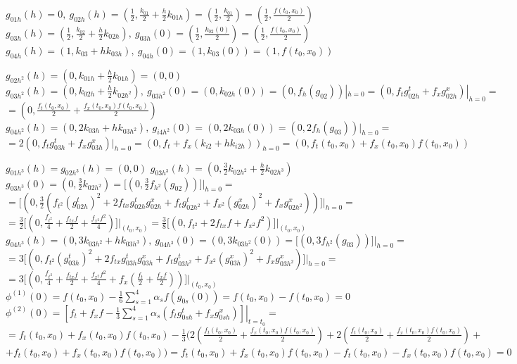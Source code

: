 \documentclass[a4paper,14pt]{article}
\begin{document}
$g_{01h}(h)=0,\ g_{02h}(h)=(\frac{1}{2},\frac{k_{01}}{2}+\frac{h}{2}k_{01h})=(\frac{1}{2},\frac{k_{01}}{2})=(\frac{1}{2},\frac{f(t_0,x_0)}{2})$\newline
$g_{03h}(h)=(\frac{1}{2},\frac{k_{02}}{2}+\frac{h}{2}k_{02h}),\ g_{03h}(0)=(\frac{1}{2},\frac{k_{02}(0)}{2})=(\frac{1}{2},\frac{f(t_0,x_0)}{2})$\newline
$g_{04h}(h)=(1,k_{03}+hk_{03h}),\ g_{04h}(0)=(1,k_{03}(0))=(1,f(t_0,x_0))$\newline

$g_{02h^2}(h)=(0,k_{01h}+\frac{h}{2}k_{01h})=(0,0)$\newline
$g_{03h^2}(h)=(0,k_{02h}+\frac{h}{2}k_{02h^2}),\ g_{03h^2}(0)=(0,k_{02h}(0))=(0,f_h(g_{02}))|_{h=0}=(0,f_tg_{02h}^t+f_xg_{02h}^x)|_{h=0}=$\newline
$=(0,\frac{f_t(t_0,x_0)}{2}+\frac{f_x(t_0,x_0)f(t_0,x_0)}{2})$\newline
$g_{04h^2}(h)=(0,2k_{03h}+hk_{03h^2}),\ g_{i4h^2}(0)=(0,2k_{03h}(0))=(0,2f_h(g_{03}))|_{h=0}=$\newline
$=2(0,f_tg_{03h}^t+f_xg_{03h}^x)|_{h=0}=(0,f_t+f_x(k_{i2}+hk_{i2h}))_{h=0}=(0,f_t(t_0,x_0)+f_x(t_0,x_0)f(t_0,x_0))$\newline

$g_{01h^3}(h)=g_{02h^3}(h)=(0,0)$\newline
$g_{03h^3}(h)=(0,\frac{3}{2}k_{02h^2}+\frac{h}{2}k_{02h^3})$\newline
$g_{03h^3}(0)=(0,\frac{3}{2}k_{02h^2})=\bigg[(0,\frac{3}{2}f_{h^2}(g_{02}))\bigg]\bigg|_{h=0}=$\newline
$=\bigg[(0,\frac{3}{2}(f_{t^2}(g_{02h}^t)^2+2f_{tx}g_{02h}^tg_{02h}^x+f_tg_{02h^2}^t+f_{x^2}(g_{02h}^x)^2+f_xg_{02h^2}^x))\bigg]\bigg|_{h=0}=$\newline
$=\frac{3}{2}\bigg[(0,\frac{f_{t^2}}{4}+\frac{f_{tx}f}{2}+\frac{f_{x^2}f^2}{4})\bigg]\bigg|_{(t_0,x_0)}=\frac{3}{8}\bigg[(0,f_{t^2}+2f_{tx}f+f_{x^2}f^2)\bigg]\bigg|_{(t_0,x_0)}$\newline
$g_{04h^3}(h)=(0,3k_{03h^2}+hk_{03h^3}),\ g_{04h^3}(0)=(0,3k_{03h^2}(0))=\bigg[(0,3f_{h^2}(g_{03}))\bigg]\bigg|_{h=0}=$\newline
$=3\bigg[(0,f_{t^2}(g_{03h}^t)^2+2f_{tx}g_{03h}^tg_{03h}^x+f_tg_{03h^2}^t+f_{x^2}(g_{03h}^x)^2+f_xg_{03h^2}^x)\bigg]\bigg|_{h=0}=$\newline
$=3\bigg[(0,\frac{f_{t^2}}{4}+\frac{f_{tx}f}{2}+\frac{f_{x^2}f^2}{4}+f_x(\frac{f_t}{2}+\frac{f_xf}{2}))\bigg]\bigg|_{(t_0,x_0)}$\newline
$\phi^{(1)}(0)=f(t_0,x_0)-\frac{1}{6}\sum\limits_{s=1}^{4}\alpha_sf(g_{0s}(0))=f(t_0,x_0)-f(t_0,x_0)=0$\newline
$\phi^{(2)}(0)=\left.\left[f_t+f_xf-\frac{1}{3}\sum\limits_{s=1}^{4}\alpha_s(f_tg_{0sh}^t+f_xg_{0sh}^x)\right]\right|_{t=t_0}=$\newline
$=f_t(t_0,x_0)+f_x(t_0,x_0)f(t_0,x_0)-\frac{1}{3}(2\left(\frac{f_t(t_0,x_0)}{2}+\frac{f_x(t_0,x_0)f(t_0,x_0)}{2}\right)+2\left(\frac{f_t(t_0,x_0)}{2}+\frac{f_x(t_0,x_0)f(t_0,x_0)}{2}\right)+$\newline
$+f_t(t_0,x_0)+f_x(t_0,x_0)f(t_0,x_0))=f_t(t_0,x_0)+f_x(t_0,x_0)f(t_0,x_0)-f_t(t_0,x_0)-f_x(t_0,x_0)f(t_0,x_0)=0$\newline
\end{document}
